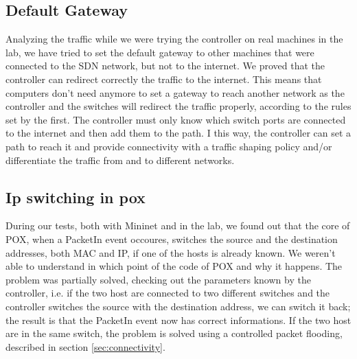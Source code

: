 \documentclass[article,10pt]{IEEEtran}
\begin{document}
\subsection{Default Gateway}

Analyzing the traffic while we were trying the controller on real machines in the lab, we have tried to set the default gateway to
other machines that were connected to the SDN network, but not to the internet. We proved that the controller can redirect correctly the
traffic to the internet. This means that
computers don't need anymore to set a gateway to reach another network as the controller and the switches will redirect the traffic
properly, according to the rules set by the first. The controller must only know which switch ports are connected to the
internet and then add them to the path. I this way, the controller can set a path to reach it and provide connectivity with
a traffic shaping policy and/or differentiate the traffic from and to different networks.

\subsection{Ip switching in pox}
During our tests, both with Mininet and in the lab, we found out that the core of POX, when a PacketIn event occoures, switches the source and the destination addresses,
both MAC and IP, if one of the hosts is already known. We weren't able to understand in which point of the code of POX  and why it happens.
The problem was partially solved, checking out the
parameters known by the controller, i.e. if the two host are connected to two different switches and the controller switches the source with the
destination address, we can switch it back; the result is that the PacketIn event now has correct informations.
If the two host are in the same switch, the problem is solved using a controlled packet flooding, described in section \ref{sec:connectivity}.
\end{document}
